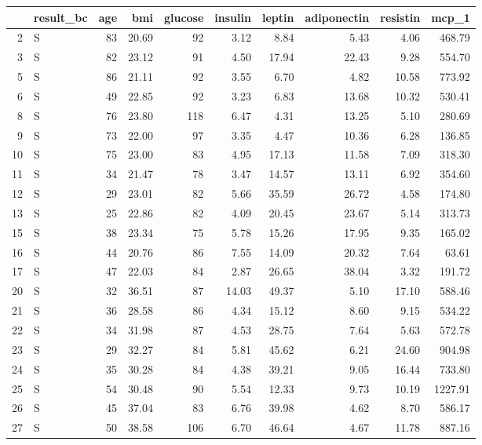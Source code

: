 \begin{table}[ht]
\centering
\begin{tabular}{rlrrrrrrrr}
  \hline
 & result\_bc & age & bmi & glucose & insulin & leptin & adiponectin & resistin & mcp\_1 \\ 
  \hline
2 & S &  83 & 20.69 &  92 & 3.12 & 8.84 & 5.43 & 4.06 & 468.79 \\ 
  3 & S &  82 & 23.12 &  91 & 4.50 & 17.94 & 22.43 & 9.28 & 554.70 \\ 
  5 & S &  86 & 21.11 &  92 & 3.55 & 6.70 & 4.82 & 10.58 & 773.92 \\ 
  6 & S &  49 & 22.85 &  92 & 3.23 & 6.83 & 13.68 & 10.32 & 530.41 \\ 
  8 & S &  76 & 23.80 & 118 & 6.47 & 4.31 & 13.25 & 5.10 & 280.69 \\ 
  9 & S &  73 & 22.00 &  97 & 3.35 & 4.47 & 10.36 & 6.28 & 136.85 \\ 
  10 & S &  75 & 23.00 &  83 & 4.95 & 17.13 & 11.58 & 7.09 & 318.30 \\ 
  11 & S &  34 & 21.47 &  78 & 3.47 & 14.57 & 13.11 & 6.92 & 354.60 \\ 
  12 & S &  29 & 23.01 &  82 & 5.66 & 35.59 & 26.72 & 4.58 & 174.80 \\ 
  13 & S &  25 & 22.86 &  82 & 4.09 & 20.45 & 23.67 & 5.14 & 313.73 \\ 
  15 & S &  38 & 23.34 &  75 & 5.78 & 15.26 & 17.95 & 9.35 & 165.02 \\ 
  16 & S &  44 & 20.76 &  86 & 7.55 & 14.09 & 20.32 & 7.64 & 63.61 \\ 
  17 & S &  47 & 22.03 &  84 & 2.87 & 26.65 & 38.04 & 3.32 & 191.72 \\ 
  20 & S &  32 & 36.51 &  87 & 14.03 & 49.37 & 5.10 & 17.10 & 588.46 \\ 
  21 & S &  36 & 28.58 &  86 & 4.34 & 15.12 & 8.60 & 9.15 & 534.22 \\ 
  22 & S &  34 & 31.98 &  87 & 4.53 & 28.75 & 7.64 & 5.63 & 572.78 \\ 
  23 & S &  29 & 32.27 &  84 & 5.81 & 45.62 & 6.21 & 24.60 & 904.98 \\ 
  24 & S &  35 & 30.28 &  84 & 4.38 & 39.21 & 9.05 & 16.44 & 733.80 \\ 
  25 & S &  54 & 30.48 &  90 & 5.54 & 12.33 & 9.73 & 10.19 & 1227.91 \\ 
  26 & S &  45 & 37.04 &  83 & 6.76 & 39.98 & 4.62 & 8.70 & 586.17 \\ 
  27 & S &  50 & 38.58 & 106 & 6.70 & 46.64 & 4.67 & 11.78 & 887.16 \\ 

\end{tabular}
\end{table}
